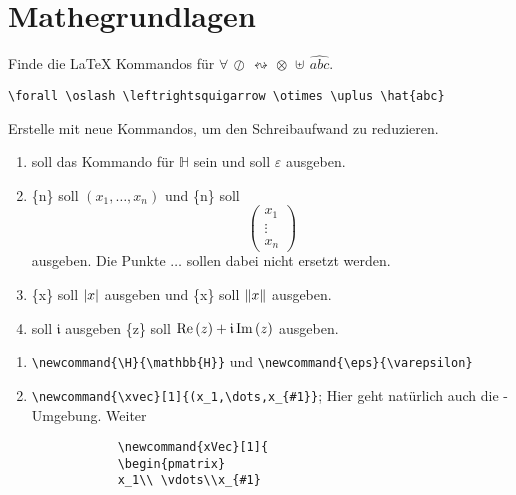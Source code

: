 \section{Mathegrundlagen}
\begin{uebung}

\item Finde die \LaTeX{} Kommandos für $\forall\,\oslash\,\leftrightsquigarrow\,\otimes\,\uplus\,\hat{abc}$.
        \begin{loesung}
            \verb|\forall \oslash \leftrightsquigarrow \otimes \uplus \hat{abc}|
        \end{loesung}
\item Erstelle mit  neue Kommandos, um den Schreibaufwand zu reduzieren.
        \begin{enumerate}[label=(\alph*)]
            \item {} soll das Kommando für $\mathbb{H}$ sein und  soll $\varepsilon$ ausgeben.
            \item {}\{n\} soll $(x_1,\dots,x_n)$ und \{n\} soll 
                \[
                    \begin{pmatrix}
                    x_1 \\ \vdots \\ x_n
                    \end{pmatrix}
                \]
                ausgeben. Die Punkte $\dots$ sollen dabei nicht ersetzt werden. 
            \item {}\{x\} soll $\lvert x\rvert$ ausgeben und \{x\} soll $\lVert x\rVert$ ausgeben. 
            \item {} soll $\mathfrak{i}$ ausgeben \{z\} soll $\operatorname{Re}\left(z\right)+\mathfrak{i}\operatorname{Im}\left(z\right)$ ausgeben.
        \end{enumerate}
        \begin{loesung}
            \begin{enumerate}[label=(\alph*)]
            \item \verb|\newcommand{\H}{\mathbb{H}}| und \verb|\newcommand{\eps}{\varepsilon}|
            \item \verb|\newcommand{\xvec}[1]{(x_1,\dots,x_{#1}}|; Hier geht natürlich auch die -Umgebung. Weiter \\
            \begin{verbatim}
            \newcommand{xVec}[1]{
            \begin{pmatrix}
            x_1\\ \vdots\\x_{#1}

\end{verbatim}
\end{enumerate}
\end{loesung}
\end{uebung}

